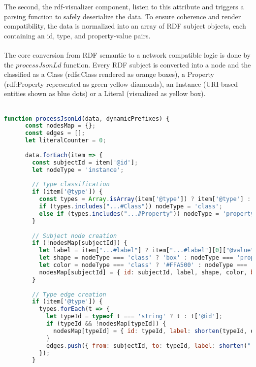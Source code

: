 The second, the rdf-visualizer component, listen to this attribute and triggers a parsing function to safely deserialize the data. To ensure coherence and render compatibility, the data is normalized into an array of RDF subject objects, each containing an id, type, and property-value pairs.
\\
\\
The core conversion from RDF semantic to a network compatible logic is done by the $processJsonLd$ function. 
Every RDF subject is converted into a node and the classified as a Class (rdfs:Class rendered as orange boxes), a Property (rdf:Property represented as green-yellow diamonds), an Instance (URI-based entities shown as blue dots) or a Literal (visualized as yellow box).
\\
\\
\begin{lstlisting}[caption={\texttt{processJsonLd} function used for graph construction}, label={lst:rdf-visualizer}, language=JavaScript]
	function processJsonLd(data, dynamicPrefixes) {
	  const nodesMap = {};
	  const edges = [];
	  let literalCounter = 0;
	
	  data.forEach(item => {
		const subjectId = item['@id'];
		let nodeType = 'instance';
	
		// Type classification
		if (item['@type']) {
		  const types = Array.isArray(item['@type']) ? item['@type'] : [item['@type']];
		  if (types.includes("...#Class")) nodeType = 'class';
		  else if (types.includes("...#Property")) nodeType = 'property';
		}
	
		// Subject node creation
		if (!nodesMap[subjectId]) {
		  let label = item["...#label"] ? item["...#label"][0]["@value"] : shorten(subjectId, dynamicPrefixes);
		  let shape = nodeType === 'class' ? 'box' : nodeType === 'property' ? 'diamond' : 'dot';
		  let color = nodeType === 'class' ? '#FFA500' : nodeType === 'property' ? '#ADFF2F' : '#97C2FC';
		  nodesMap[subjectId] = { id: subjectId, label, shape, color, baseColor: color, nodeType, font: { color: "#000000" } };
		}
	
		// Type edge creation
		if (item['@type']) {
		  types.forEach(t => {
			let typeId = typeof t === 'string' ? t : t['@id'];
			if (typeId && !nodesMap[typeId]) {
			  nodesMap[typeId] = { id: typeId, label: shorten(typeId, dynamicPrefixes), shape: 'box', color: '#FFA500', ... };
			}
			edges.push({ from: subjectId, to: typeId, label: shorten("...#type", dynamicPrefixes), dashes: true, color: { color: '#000' } });
		  });
		}
	

\end{lstlisting}
